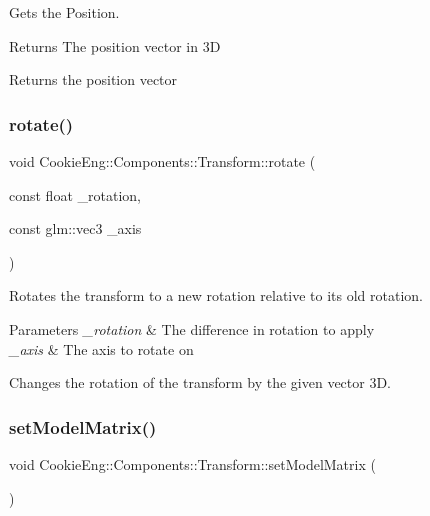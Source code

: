 Gets the Position. 

\begin{DoxyReturn}{Returns}
The position vector in 3D
\end{DoxyReturn}
Returns the position vector \mbox{\label{class_cookie_eng_1_1_components_1_1_transform_a061b3b2b5d33c1dda2955e9b2e01d736}} 
\subsubsection{\texorpdfstring{rotate()}{rotate()}}
{\footnotesize\ttfamily void Cookie\+Eng\+::\+Components\+::\+Transform\+::rotate (\begin{DoxyParamCaption}\item[{const float}]{\+\_\+rotation,  }\item[{const glm\+::vec3}]{\+\_\+axis }\end{DoxyParamCaption})}



Rotates the transform to a new rotation relative to its old rotation. 


\begin{DoxyParams}{Parameters}
{\em \+\_\+rotation} & The difference in rotation to apply \\
\hline
{\em \+\_\+axis} & The axis to rotate on\\
\hline
\end{DoxyParams}
Changes the rotation of the transform by the given vector 3D. \mbox{\label{class_cookie_eng_1_1_components_1_1_transform_a169960289f66442f692bb52c4c86478e}} 
\subsubsection{\texorpdfstring{set\+Model\+Matrix()}{setModelMatrix()}}
{\footnotesize\ttfamily void Cookie\+Eng\+::\+Components\+::\+Transform\+::set\+Model\+Matrix (\begin{DoxyParamCaption}{ }\end{DoxyParamCaption})}



